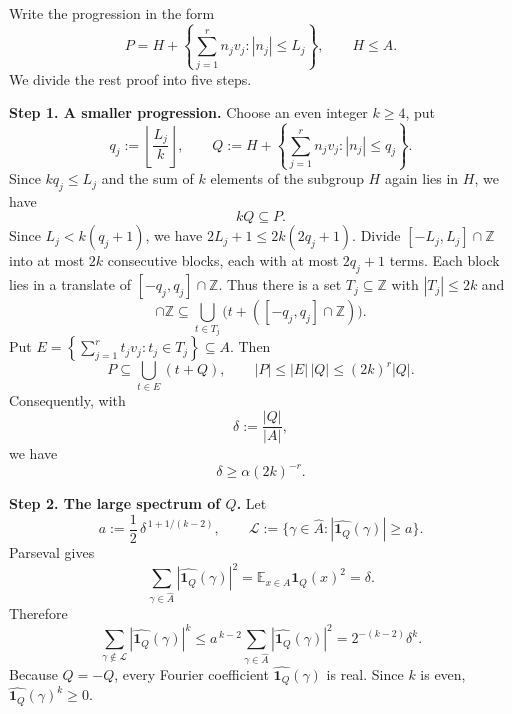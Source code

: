 \documentclass[twoside]{aomart}
\makeatletter
\theoremstyle{paperplain}
\theoremstyle{paperdefinition}
\renewenvironment{proof}[1][\proofname]{\par\pushQED{\qed}%
  \normalfont\topsep6\p@\@plus3\p@\relax\trivlist
  \item[\hskip\labelsep\itshape #1\@addpunct{.}]\ignorespaces
}{\popQED\endtrivlist\@endpefalse}
\numberwithin{equation}{section}
\makeatother
\begin{document}
\begin{proof}
Write the progression in the form
\[
 P=H+\left\{\sum_{j=1}^r n_jv_j: |n_j|\le L_j\right\},
 \qquad H\le A.
\]
We divide the rest proof into five steps.

\par
\medskip
\noindent\textbf{Step 1. A smaller progression.}
Choose an even integer $k\ge4$, put
\[
 q_j:=\left\lfloor\frac{L_j}{k}\right\rfloor,
 \qquad
 Q:=H+\left\{\sum_{j=1}^r n_jv_j: |n_j|\le q_j\right\}.
\]
Since $kq_j\le L_j$ and the sum of $k$ elements of the subgroup $H$
again lies in $H$, we have
\begin{equation*}
 kQ\subseteq P.
\end{equation*}
Since $L_j<k(q_j+1)$, we have
$2L_j+1\le2k(2q_j+1)$. Divide $[-L_j,L_j]\cap\mathbb Z$ into
at most $2k$ consecutive blocks, each with at most $2q_j+1$ terms.
Each block lies in a translate of $[-q_j,q_j]\cap\mathbb Z$.
Thus there is a set $T_j\subseteq\mathbb Z$ with $|T_j|\le2k$ and
\begin{equation*}
 [-L_j,L_j]\cap\mathbb Z
 \subseteq\bigcup_{t\in T_j}\bigl(t+([-q_j,q_j]\cap\mathbb Z)\bigr).
\end{equation*}
Put $\displaystyle E=\left\{\sum_{j=1}^r t_jv_j:t_j\in T_j\right\}\subseteq A$. Then
\begin{equation*}
 P\subseteq\bigcup_{t\in E}(t+Q),\qquad
 |P|\le |E|\,|Q|\le(2k)^r|Q|.
\end{equation*}
Consequently, with
\[
 \delta:=\frac{|Q|}{|A|},
\]
we have
\begin{equation}
 \delta\ge \alpha(2k)^{-r}.
 \label{inv:eq:progression-density}
\end{equation}

\par
\medskip
\noindent\textbf{Step 2. The large spectrum of $Q$.}
Let
\begin{equation*}
 a:=\frac12\,\delta^{\,1+1/(k-2)},
 \qquad
 \mathcal L:=\{\gamma\in\widehat A:
          |\widehat{\mathbf 1_Q}(\gamma)|\ge a\}.
\end{equation*}
Parseval gives
\[
 \sum_{\gamma\in\widehat A}
       |\widehat{\mathbf 1_Q}(\gamma)|^2
   =\mathbb E_{x\in A}\mathbf 1_Q(x)^2
   =\delta.
\]
Therefore
\begin{equation}
 \sum_{\gamma\notin\mathcal L}
       |\widehat{\mathbf 1_Q}(\gamma)|^k
 \le a^{\,k-2}
       \sum_{\gamma\in\widehat A}
       |\widehat{\mathbf 1_Q}(\gamma)|^2
 =2^{-(k-2)}\delta^k.
 \label{inv:eq:progression-spectrum-tail}
\end{equation}
Because $Q=-Q$, every Fourier coefficient
$\widehat{\mathbf 1_Q}(\gamma)$ is real. Since $k$ is even,
$\widehat{\mathbf 1_Q}(\gamma)^k\ge0$.


\end{proof}
\end{document}
